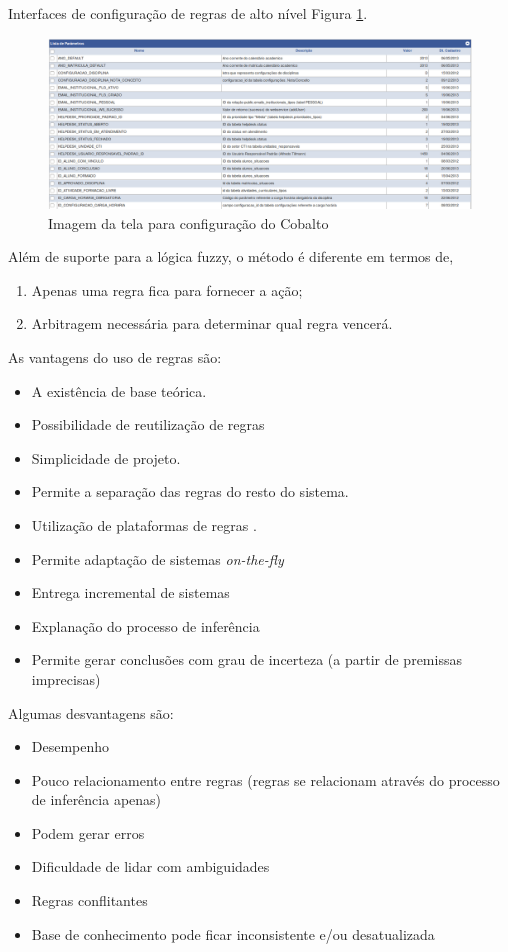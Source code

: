 \documentclass[12pt,a4paper,compsoc]{IEEEtran}
\begin{document}
  Interfaces de configuração de regras de alto nível  Figura \ref{config-cobalto}.

  \begin{figure}[!ht]
    \centerline{\includegraphics[width=.3\textwidth]{imagens/config-cobalto}}
    \caption{Imagem da tela para configuração do Cobalto}
    \label{config-cobalto}
  \end{figure}

  Além de suporte para a lógica fuzzy, o método é diferente em termos de,
  
  \begin{enumerate}
    \item Apenas uma regra fica para fornecer a ação;
    \item Arbitragem necessária para determinar qual regra vencerá.
  \end{enumerate}
  
  As vantagens do uso de regras são:

  \begin{itemize}
    \item A existência de base teórica.
    \item Possibilidade de reutilização de regras
    \item Simplicidade de projeto. 
    \item Permite a separação das regras do resto do sistema.
    \item Utilização de plataformas de regras .
    \item Permite adaptação de sistemas \textit{on-the-fly}
    \item Entrega incremental de sistemas
    \item Explanação do processo de inferência
    \item Permite gerar conclusões com grau de incerteza (a partir de premissas imprecisas)
  \end{itemize}
  
  Algumas desvantagens são:

  \begin{itemize}
    \item Desempenho
    \item Pouco relacionamento entre regras (regras se relacionam através do processo de inferência
    apenas)
    \item Podem gerar erros
    \item Dificuldade de lidar com ambiguidades
    \item Regras conflitantes
    \item Base de conhecimento  pode ficar inconsistente e/ou desatualizada  
  \end{itemize}
\end{document}
